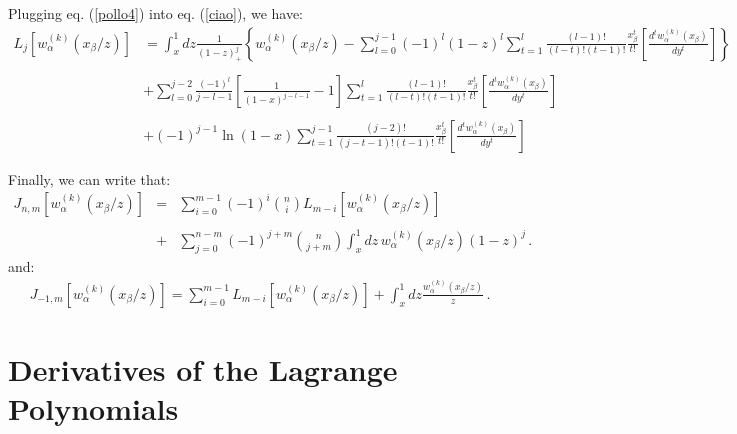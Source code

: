 \documentclass[10pt,a4paper]{article}
\begin{document}
Plugging eq. (\ref{pollo4}) into eq. (\ref{ciao}), we have:
\begin{equation}\label{ciao}
\begin{array}{rl}
L_j[w_\alpha^{(k)}(x_\beta/z)] & = \displaystyle \int_x^1 dz\frac{1}{(1-z)_+^j}\left\{w_\alpha^{(k)}(x_\beta/z) - \sum_{l=0}^{j-1} (-1)^l (1-z)^l
  \sum_{t=1}^l \frac{(l-1)!}{(l-t)!(t-1)!}\frac{x_\beta^t}{t!} \left[\frac{d^t
  w_\alpha^{(k)}(x_\beta)}{dy^t}\right] 
\right\} \\
\\
& + \displaystyle \sum_{l=0}^{j-2} \frac{(-1)^l}{j-l-1}\left[\frac1{(1-x)^{j-l-1}}-1\right]
  \sum_{t=1}^l \frac{(l-1)!}{(l-t)!(t-1)!}\frac{x_\beta^t}{t!} \left[\frac{d^t
  w_\alpha^{(k)}(x_\beta)}{dy^t}\right]\\
\\
& + \displaystyle (-1)^{j-1}\ln(1-x)\sum_{t=1}^{j-1} \frac{(j-2)!}{(j-t-1)!(t-1)!}\frac{x_\beta^t}{t!} \left[\frac{d^t
  w_\alpha^{(k)}(x_\beta)}{dy^t}\right] 
\end{array}
\end{equation}

Finally, we can write that:
\begin{equation}
\begin{array}{rcl}
\displaystyle J_{n,m}[w_\alpha^{(k)}(x_\beta/z)] &=& \displaystyle
\sum_{i=0}^{m-1} (-1)^i {n \choose i}
L_{m-i}[w_\alpha^{(k)}(x_\beta/z)] \\
\\
&+& \displaystyle \sum_{j=0}^{n-m}(-1)^{j+m}{n \choose j+m}\int_x^1dz
\,w_\alpha^{(k)}(x_\beta/z) (1-z)^j\,.
\end{array}
\end{equation}
and:
\begin{equation}
\begin{array}{c}
\displaystyle J_{-1,m}[w_\alpha^{(k)}(x_\beta/z)] = \sum_{i=0}^{m-1} L_{m-i}[w_\alpha^{(k)}(x_\beta/z)] +
\int_x^1dz\frac{w_\alpha^{(k)}(x_\beta/z)}{z}\,.
\end{array}
\end{equation}


\section{Derivatives of the Lagrange Polynomials}\label{DerivativesLP}
\end{document}
